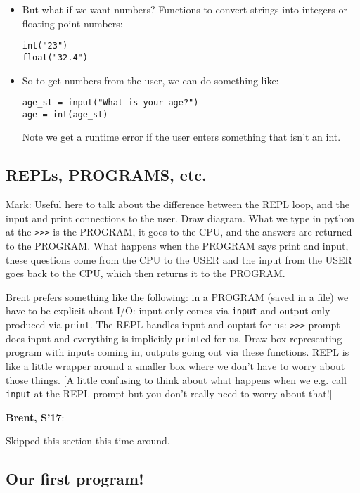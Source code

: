 \documentclass{article}
\newenvironment{reflect}[1]
{
  \noindent
  \begin{lrbox}{\reflectbox}
    \begin{minipage}[t]{\textwidth}
      \textbf{#1}:
}{
    \end{minipage}
  \end{lrbox}
  \fbox{\usebox{\reflectbox}}
}
\begin{document}
\begin{itemize}
\item  But what if we want numbers? Functions to convert strings into
  integers or floating point numbers:
\begin{verbatim}
int("23")
float("32.4")
\end{verbatim}

\item So to get numbers from the user, we can do something like:
\begin{verbatim}
age_st = input("What is your age?")
age = int(age_st)
\end{verbatim}

  Note we get a runtime error if the user enters something that isn't
  an int.
\end{itemize}

\subsection*{REPLs, PROGRAMS, etc.}

Mark: Useful here to talk about the difference between the REPL loop,
and the input and print connections to the user. Draw diagram. What we
type in python at the \verb|>>>| is the PROGRAM, it goes to the CPU,
and the answers are returned to the PROGRAM. What happens when the
PROGRAM says print and input, these questions come from the CPU to the
USER and the input from the USER goes back to the CPU, which then
returns it to the PROGRAM.

Brent prefers something like the following: in a PROGRAM (saved in a
file) we have to be explicit about I/O: input only comes via
\verb|input| and output only produced via \verb|print|.  The REPL
handles input and ouptut for us: \verb|>>>| prompt does input and
everything is implicitly \verb|print|ed for us.  Draw box representing
program with inputs coming in, outputs going out via these functions.
REPL is like a little wrapper around a smaller box where we don't have
to worry about those things.  [A little confusing to think about what
happens when we e.g. call \verb|input| at the REPL prompt but you
don't really need to worry about that!]

\begin{reflect}{Brent, S'17}
Skipped this section this time around.
\end{reflect}

\subsection*{Our first program!}
\end{document}
